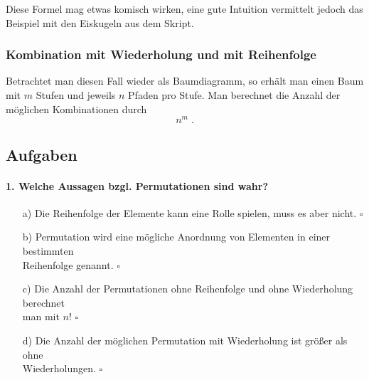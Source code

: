 \documentclass[a4paper]{article}
\newcommand\dangersign[1][2ex]{%
  \renewcommand\stacktype{L}%
  \scaleto{\stackon[1.3pt]{\color{red}$\triangle$}{\tiny !}}{#1}%
}
\begin{document}
\noindent \dangersign[3ex] Diese Formel mag etwas komisch wirken, eine gute Intuition vermittelt jedoch das Beispiel mit den Eiskugeln aus dem Skript.

\subsubsection{Kombination mit Wiederholung und mit Reihenfolge}
Betrachtet man diesen Fall wieder als Baumdiagramm, so erhält man einen Baum mit $m$ Stufen und jeweils $n$ Pfaden pro Stufe. Man berechnet die Anzahl der möglichen Kombinationen durch $$n^m\;.$$

\clearpage

\subsection{Aufgaben}
\paragraph{1. Welche Aussagen bzgl. Permutationen sind wahr?}
\begin{itemize}
    \item[a)] Die Reihenfolge der Elemente kann eine Rolle spielen, muss es aber nicht. \hfill $\square$
    \item[b)] Permutation wird eine mögliche Anordnung von Elementen in einer bestimmten\\ Reihenfolge genannt.  \hfill $\square$
    \item[c)] Die Anzahl der Permutationen ohne Reihenfolge und ohne Wiederholung berechnet\\ man mit $n!$ \hfill $\square$
    \item[d)] Die Anzahl der möglichen Permutation mit Wiederholung ist größer als ohne\\ Wiederholungen. \hfill $\square$
\end{itemize}
\end{document}
